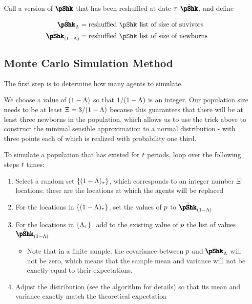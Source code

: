 \documentclass[../BufferStockTheory.tex]{subfiles}\usepackage{ApndxSteadyState}
\begin{document}
  Call a version of $\vctr{\pShk}$ that has been reshuffled at date $\tau$ $\tilde{\vctr{\pShk}}$, and define

  \newcommand{\pShkOldRemix}{\tilde{\vctr{\pShk}}_{\Liv}}
  \newcommand{\pShkNewRemix}{\tilde{\vctr{\pShk}}_{\Die}}
  \begin{align}
    \pShkOldRemix & = \text{reshuffled $\pShk$ list of size of suvivors} 
    \\  \pShkNewRemix & = \text{reshuffled $\pShk$ list of size of newborns}
  \end{align}

  \subsection{Monte Carlo Simulation Method}

  The first step is to determine how many agents to simulate.

  \newcommand{\popMult}{\Xi}

  We choose a value of $(1-\Lambda)$ so that $1/(1-\Lambda)$ is an integer.  Our population size needs to be at least $\popMult = 3/\Die$ because this guarantees that there will be at least three newborns in the population, which allows us to use the trick above to construct the minimal sensible approximation to a normal distribution - with three points each of which is realized with probability one third.

  To simulate a population that has existed for $t$ periods, loop over the following steps $t$ times:
  \begin{enumerate}
  \item Select a random set $\{(1-\Lambda)_{\tau}\}$, which corresponds to an integer number $\popMult$ locations; these are the locations at which the agents will be replaced 
  \item For the locations in $\{(1-\Lambda)_{\tau}\}$, set the values of $p$ to $\pShkNewRemix$
  \item For the locations in $\{\Lambda_{\tau}\}$, add to the existing value of $p$ the list of values $\pShkNewRemix$
    \begin{itemize}
    \item Note that in a finite sample, the covariance between $p$ and $\pShkOldRemix$ will not be zero, which means that the sample mean and variance will not be exactly equal to their expectations.
    \end{itemize}
\item Adjust the distribution (see the algorithm for details) so that its mean and variance exactly match the theoretical expectation    
  \end{enumerate}
\end{document}
